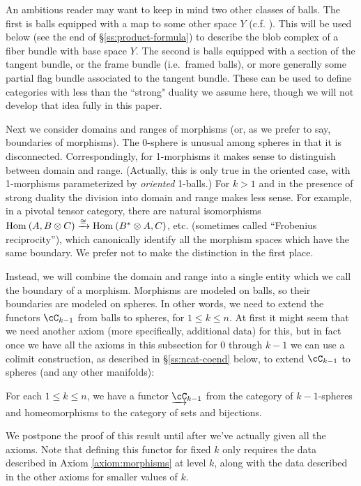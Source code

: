 An ambitious reader may want to keep in mind two other classes of balls.
The first is balls equipped with a map to some other space $Y$ (c.f. \cite{MR2079378}). 
This will be used below (see the end of \S \ref{ss:product-formula}) to describe the blob complex of a fiber bundle with
base space $Y$.
The second is balls equipped with a section of the tangent bundle, or the frame
bundle (i.e.\ framed balls), or more generally some partial flag bundle associated to the tangent bundle.
These can be used to define categories with less than the ``strong" duality we assume here,
though we will not develop that idea fully in this paper.

Next we consider domains and ranges of morphisms (or, as we prefer to say, boundaries
of morphisms).
The 0-sphere is unusual among spheres in that it is disconnected.
Correspondingly, for 1-morphisms it makes sense to distinguish between domain and range.
(Actually, this is only true in the oriented case, with 1-morphisms parameterized
by {\it oriented} 1-balls.)
For $k>1$ and in the presence of strong duality the division into domain and range makes less sense.
For example, in a pivotal tensor category, there are natural isomorphisms $\operatorname{Hom}_{}\left(A,B \otimes C\right) \xrightarrow{\cong} \operatorname{Hom}_{}\left(B^* \otimes A,C\right)$, etc. 
(sometimes called ``Frobenius reciprocity''), which canonically identify all the morphism spaces which have the same boundary.
We prefer not to make the distinction in the first place.

Instead, we will combine the domain and range into a single entity which we call the 
boundary of a morphism.
Morphisms are modeled on balls, so their boundaries are modeled on spheres.
In other words, we need to extend the functors $\cC_{k-1}$ from balls to spheres, for 
$1\le k \le n$.
At first it might seem that we need another axiom 
(more specifically, additional data) for this, but in fact once we have
all the axioms in this subsection for $0$ through $k-1$ we can use a colimit
construction, as described in \S\ref{ss:ncat-coend} below, to extend $\cC_{k-1}$
to spheres (and any other manifolds):

\begin{lem}
\label{lem:spheres}
For each $1 \le k \le n$, we have a functor $\cl{\cC}_{k-1}$ from 
the category of $k{-}1$-spheres and 
homeomorphisms to the category of sets and bijections.
\end{lem}

We postpone the proof of this result until after we've actually given all the axioms.
Note that defining this functor for fixed $k$ only requires the data described in Axiom \ref{axiom:morphisms} at level $k$, 
along with the data described in the other axioms for smaller values of $k$. 

